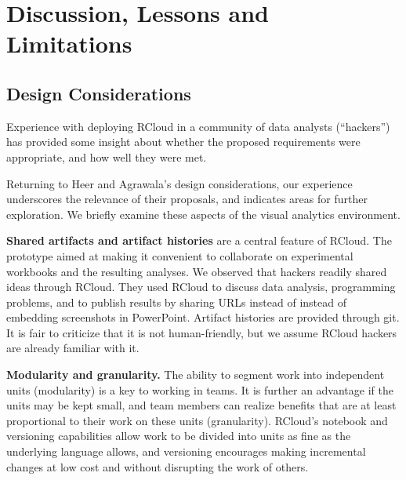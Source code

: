 \section{Discussion, Lessons and Limitations}
\label{sec:limitations}


\subsection{Design Considerations}


Experience with deploying RCloud in a community of data analysts
(``hackers'') has provided some insight about whether the proposed
requirements were appropriate, and how well they were met.

Returning to Heer and Agrawala's design considerations, our experience
underscores the relevance of their proposals, and indicates areas
for further exploration. We briefly examine these aspects of the
visual analytics environment.

{\bf Shared artifacts and artifact histories} are a central feature
of RCloud. The prototype aimed at making it convenient to collaborate
on experimental workbooks and the resulting analyses. We observed
that hackers readily shared ideas through RCloud. They used RCloud
to discuss data analysis, programming problems, and to publish results
by sharing URLs instead of instead of embedding screenshots in
PowerPoint. Artifact histories are provided through git. It is fair
to criticize that it is not human-friendly, but we assume RCloud
hackers are already familiar with it.

{\bf Modularity and granularity.} The ability to segment work into
independent units (modularity) is a key to working in teams. It is
further an advantage if the units may be kept small, and team members
can realize benefits that are at least proportional to their work
on these units (granularity). RCloud's notebook and versioning
capabilities allow work to be divided into units as fine as
the underlying language allows, and versioning encourages making
incremental changes at low cost and without disrupting the work
of others.

